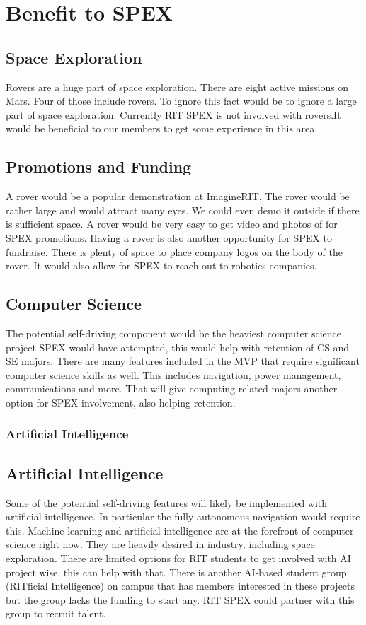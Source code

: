 \documentclass[conference]{IEEEtran} %
\begin{document}
\section{Benefit to SPEX}
\label{sec:benefit}

\subsection{Space Exploration}
\label{subsec:spacex}
Rovers are a huge part of space exploration. There are eight active missions on Mars. Four of those include rovers. To ignore this fact would be to ignore a large part of space exploration. Currently RIT SPEX is not involved with rovers.It would be beneficial to our members to get some experience in this area.

\subsection{Promotions and Funding}
\label{subsec:promos}
A rover would be a popular demonstration at ImagineRIT. The rover would be rather large and would attract many eyes. We could even demo it outside if there is sufficient space. A rover would be very easy to get video and photos of for SPEX promotions. Having a rover is also another opportunity for SPEX to fundraise. There is plenty of space to place company logos on the body of the rover. It would also allow for SPEX to reach out to robotics companies.

\subsection{Computer Science}
\label{subsec:cs}
The potential self-driving component would be the heaviest computer science project SPEX would have attempted, this would help with retention of CS and SE majors. There are many features included in the MVP that require significant computer science skills as well. This includes navigation, power management, communications and more. That will give computing-related majors another option for SPEX involvement, also helping retention.
\subsubsection{Artificial Intelligence}

\subsection{Artificial Intelligence}
\label{subsec:ai}
Some of the potential self-driving features will likely be implemented with artificial intelligence. In particular the fully autonomous navigation would require this. Machine learning and artificial intelligence are at the forefront of computer science right now. They are heavily desired in industry, including space exploration. There are limited options for RIT students to get involved with AI project wise, this can help with that. There is another AI-based student group (RITficial Intelligence) on campus that has members interested in these projects but the group lacks the funding to start any. RIT SPEX could partner with this group to recruit talent.
\end{document}
